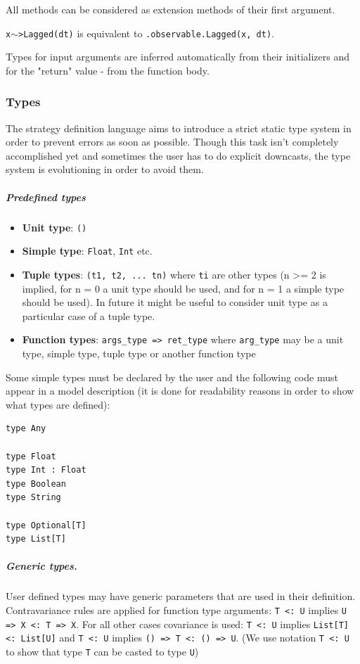 \documentclass[a4paper,11pt]{article}
\begin{document}
All methods can be considered as extension methods of their first argument. 

\texttt{x$\sim$>Lagged(dt)} is equivalent to \texttt{.observable.Lagged(x, dt)}.

Types for input arguments are inferred automatically from their initializers and for the "return" value - from the function body.

\subsubsection{Types}

The strategy definition language aims to introduce a strict static type system in order to prevent errors as soon as possible. Though this task isn't completely accomplished yet and sometimes the user has to do explicit downcasts, the type system is evolutioning in order to avoid them.


\subparagraph{Predefined types}

\begin{itemize}
\itemsep1pt\parskip0pt
\item
  \textbf{Unit type}: \texttt{()}
\item
  \textbf{Simple type}: \texttt{Float}, \texttt{Int} etc.
\item
  \textbf{Tuple types}: \texttt{(t1, t2, ... tn)} where \texttt{ti} are
  other types (n \textgreater{}= 2 is implied, for n = 0 a unit type
  should be used, and for n = 1 a simple type should be used). In future
  it might be useful to consider unit type as a particular case of a
  tuple type.
\item
  \textbf{Function types}: \texttt{args\_type =\textgreater{} ret\_type}
  where \texttt{arg\_type} may be a unit type, simple type, tuple type
  or another function type
\end{itemize}

Some simple types must be declared by the user and the following code
must appear in a model description (it is done for readability reasons
in order to show what types are defined):

\begin{verbatim}
type Any

type Float
type Int : Float
type Boolean
type String

type Optional[T]
type List[T]
\end{verbatim}

\subparagraph{Generic types.}


User defined types may have generic parameters that are used in their
definition. Contravariance rules are applied for function type
arguments: \texttt{T\,\textless{}:\,U} implies
\texttt{U\,=\textgreater{}\,X\,\textless{}:\,T\,=\textgreater{}\,X}. For all
other cases covariance is used: \texttt{T\,\textless{}:\,U} implies
\texttt{List{[}T{]}\,\textless{}:\,List{[}U{]}} and
\texttt{T\,\textless{}:\,U} implies
\texttt{()\,=\textgreater{}\,T\,\textless{}:\,()\,=\textgreater{}\,U}. (We use
notation \texttt{T\,\textless{}:\,U} to show that type \texttt{T} can be
casted to type \texttt{U})
\end{document}
